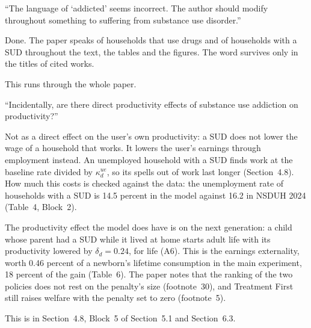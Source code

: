 \documentclass[11pt]{article}
\begin{document}
\begin{referee}
``The language of `addicted' seems incorrect. The author should modify throughout
something to suffering from substance use disorder.''
\end{referee}
\begin{response}
Done. The paper speaks of households that use drugs and of households with a SUD
throughout the text, the tables and the figures. The word survives only in the
titles of cited works.

This runs through the whole paper.
\end{response}

\begin{referee}
``Incidentally, are there direct productivity effects of substance use addiction
on productivity?''
\end{referee}
\begin{response}
\open Not as a direct effect on the user's own productivity: a SUD does not lower
the wage of a household that works. It lowers the user's earnings through
employment instead. An unemployed household with a SUD finds work at the baseline
rate divided by $\kappa^{ue}_d$, so its spells out of work last longer
(Section~4.8). How much this costs is checked against the data: the unemployment
rate of households with a SUD is 14.5 percent in the model against 16.2 in NSDUH
2024 (Table~4, Block~2).

The productivity effect the model does have is on the next generation: a child
whose parent had a SUD while it lived at home starts adult life with its
productivity lowered by $\delta_d=0.24$, for life (A6). This is the earnings
externality, worth 0.46 percent of a newborn's lifetime consumption in the main
experiment, 18 percent of the gain (Table~6). The paper notes that the ranking of
the two policies does not rest on the penalty's size (footnote~30), and Treatment
First still raises welfare with the penalty set to zero (footnote~5).

This is in Section~4.8, Block~5 of Section~5.1 and Section~6.3.
\end{response}
\end{document}

